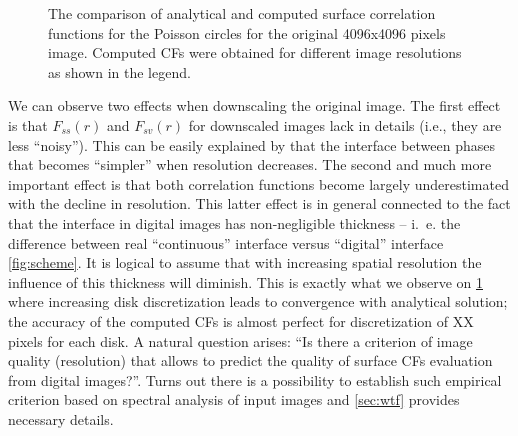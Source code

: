 \documentclass[reprint,amsmath,amssymb,aps,pre]{revtex4-1}
\begin{document}
\begin{figure}[ht]
  \centering
  \hfill
    \caption[]{The comparison of analytical and computed surface correlation
      functions for the Poisson circles for the original 4096x4096 pixels
      image. Computed CFs were obtained for different image resolutions as shown
      in the legend.}
    \label{fig:scaling}
\end{figure}

We can observe two effects when downscaling the original image. The
first effect is that $F_{ss}(r)$ and $F_{sv}(r)$ for downscaled images lack in
details (i.e., they are less ``noisy''). This can be easily explained by that the
interface between phases that becomes ``simpler'' when resolution decreases. The
second and much more important effect is that both correlation functions become
largely underestimated with the decline in resolution. This latter effect is in
general connected to the fact that the interface in digital images has
non-negligible thickness -- i.~e. the difference between real ``continuous''
interface versus ``digital'' interface \cref{fig:scheme}. It is logical to
assume that with increasing spatial resolution the influence of this thickness
will diminish. This is exactly what we observe on \cref{fig:scaling} where
increasing disk discretization leads to convergence with analytical solution;
the accuracy of the computed CFs is almost perfect for discretization of XX
pixels for each disk. A natural question arises: ``Is there a criterion of image
quality (resolution) that allows to predict the quality of surface CFs
evaluation from digital images?''. Turns out there is a possibility to establish
such empirical criterion based on spectral analysis of input images and
\cref{sec:wtf} provides necessary details.
\end{document}
